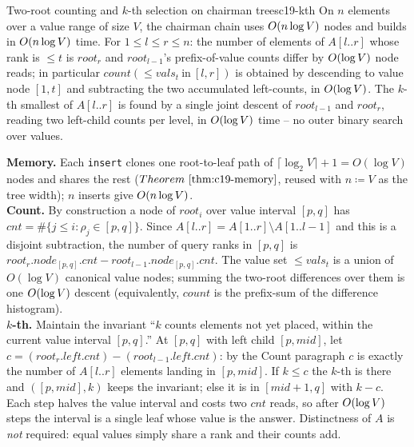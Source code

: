 \begin{theorem}{Two-root counting and \(k\)-th selection on chairman trees}{c19-kth}
On \(n\) elements over a value range of size \(V\), the chairman chain uses \(O(n\log V)\) nodes and builds in \(O(n\log V)\) time. For \(1\le l\le r\le n\): the number of elements of \(A[l..r]\) whose rank is \(\le t\) is \(\mathit{root}_r\) and \(\mathit{root}_{l-1}\)'s prefix-of-value counts differ by \(O(\log V)\) node reads; in particular \(\mathit{count}(\le \mathit{vals}_t\ \text{in}\ [l,r])\) is obtained by descending to value node \([1,t]\) and subtracting the two accumulated left-counts, in \(O(\log V)\). The \(k\)-th smallest of \(A[l..r]\) is found by a single joint descent of \(\mathit{root}_{l-1}\) and \(\mathit{root}_r\), reading two left-child counts per level, in \(O(\log V)\) time -- no outer binary search over values.
\end{theorem}
\begin{proofbox}
\textbf{Memory.} Each \texttt{insert} clones one root-to-leaf path of \(\lceil\log_2 V\rceil+1=O(\log V)\) nodes and shares the rest (\(\thmref{c19-memory}\), reused with \(n\coloneqq V\) as the tree width); \(n\) inserts give \(O(n\log V)\).\\
\textbf{Count.} By construction a node of \(\mathit{root}_i\) over value interval \([p,q]\) has \(\mathit{cnt}=\#\{j\le i:\rho_j\in[p,q]\}\). Since \(A[l..r]=A[1..r]\setminus A[1..l-1]\) and this is a disjoint subtraction, the number of query ranks in \([p,q]\) is \(\mathit{root}_r.\mathit{node}_{[p,q]}.\mathit{cnt}-\mathit{root}_{l-1}.\mathit{node}_{[p,q]}.\mathit{cnt}\). The value set \(\le\mathit{vals}_t\) is a union of \(O(\log V)\) canonical value nodes; summing the two-root differences over them is one \(O(\log V)\) descent (equivalently, \(\mathit{count}\) is the prefix-sum of the difference histogram).\\
\textbf{\(k\)-th.} Maintain the invariant ``\(k\) counts elements not yet placed, within the current value interval \([p,q]\).'' At \([p,q]\) with left child \([p,\mathit{mid}]\), let \(c=(\mathit{root}_r.\mathit{left}.\mathit{cnt})-(\mathit{root}_{l-1}.\mathit{left}.\mathit{cnt})\): by the Count paragraph \(c\) is exactly the number of \(A[l..r]\) elements landing in \([p,\mathit{mid}]\). If \(k\le c\) the \(k\)-th is there and \(([p,\mathit{mid}],k)\) keeps the invariant; else it is in \([\mathit{mid}+1,q]\) with \(k-c\). Each step halves the value interval and costs two \(\mathit{cnt}\) reads, so after \(O(\log V)\) steps the interval is a single leaf whose value is the answer. Distinctness of \(A\) is \emph{not} required: equal values simply share a rank and their counts add.
\end{proofbox}

